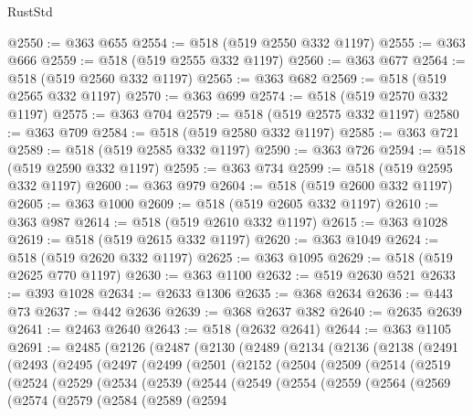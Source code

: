 \begin{lexlean}{RustStd}
\begin{coremodule}
@2550 := @363 @655
@2554 := @518 (@519 @2550 @332 @1197)
@2555 := @363 @666
@2559 := @518 (@519 @2555 @332 @1197)
@2560 := @363 @677
@2564 := @518 (@519 @2560 @332 @1197)
@2565 := @363 @682
@2569 := @518 (@519 @2565 @332 @1197)
@2570 := @363 @699
@2574 := @518 (@519 @2570 @332 @1197)
@2575 := @363 @704
@2579 := @518 (@519 @2575 @332 @1197)
@2580 := @363 @709
@2584 := @518 (@519 @2580 @332 @1197)
@2585 := @363 @721
@2589 := @518 (@519 @2585 @332 @1197)
@2590 := @363 @726
@2594 := @518 (@519 @2590 @332 @1197)
@2595 := @363 @734
@2599 := @518 (@519 @2595 @332 @1197)
@2600 := @363 @979
@2604 := @518 (@519 @2600 @332 @1197)
@2605 := @363 @1000
@2609 := @518 (@519 @2605 @332 @1197)
@2610 := @363 @987
@2614 := @518 (@519 @2610 @332 @1197)
@2615 := @363 @1028
@2619 := @518 (@519 @2615 @332 @1197)
@2620 := @363 @1049
@2624 := @518 (@519 @2620 @332 @1197)
@2625 := @363 @1095
@2629 := @518 (@519 @2625 @770 @1197)
@2630 := @363 @1100
@2632 := @519 @2630 @521
@2633 := @393 @1028
@2634 := @2633 @1306
@2635 := @368 @2634
@2636 := @443 @73
@2637 := @442 @2636
@2639 := @368 @2637 @382
@2640 := @2635 @2639
@2641 := @2463 @2640
@2643 := @518 (@2632 @2641)
@2644 := @363 @1105
@2691 := @2485
    (@2126
      (@2487
        (@2130
          (@2489
            (@2134
              (@2136
                (@2138
                  (@2491
                    (@2493
                      (@2495
                        (@2497
                          (@2499
                            (@2501
                              (@2152
                                (@2504
                                  (@2509
                                    (@2514
                                      (@2519
                                        (@2524
                                          (@2529
                                            (@2534
                                              (@2539
                                                (@2544
                                                  (@2549
                                                    (@2554
                                                      (@2559
                                                        (@2564
                                                          (@2569
                                                            (@2574
                                                              (@2579
                                                                (@2584
                                                                  (@2589
                                                                    (@2594

\end{coremodule}
\end{lexlean}
